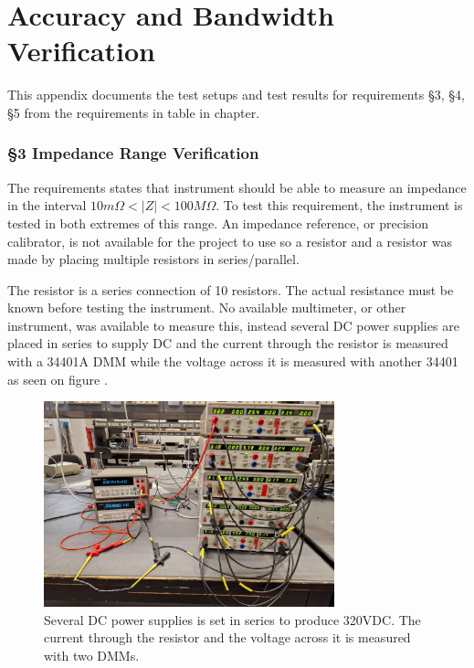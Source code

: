 \chapter{Accuracy and Bandwidth Verification} \label{App:AccuracyBWTest}
This appendix documents the test setups and test results for requirements §3, §4, §5 from the requirements in table  in chapter.

\subsection{§3 Impedance Range Verification} \label{subsec:ZRangeVerify} 
The requirements states that instrument should be able to measure an impedance in the interval $10m\Omega < |Z| < 100M \Omega$. To test this requirement, the instrument is tested in both extremes of this range. An impedance reference, or precision calibrator, is not available for the project to use so a  resistor and a  resistor was made by placing multiple resistors in series/parallel.


The  resistor is a series connection of 10  resistors. The actual resistance must be known before testing the instrument. No available multimeter, or other instrument, was available to measure this, instead several DC power supplies are placed in series to supply DC and the current through the resistor is measured with a 34401A DMM while the voltage across it is measured with another 34401 as seen on figure .

\begin{figure}[H]
    \centering
    \includegraphics[clip, trim=0 0 0 0, width=0.75\textwidth]{Appendix/Figures/A_Z_100MegSetup.pdf}
    \caption{Several DC power supplies is set in series to produce 320VDC. The current through the resistor and the voltage across it is measured with two DMMs.}
    \label{fig:App_A_Z_100MEGSetup}
\end{figure}

